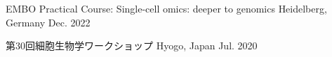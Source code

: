 

\begin{cvhonors}

  \cvworkshop
    {}
    {EMBO Practical Course: Single-cell omics: deeper to genomics} %
    {Heidelberg, Germany} %
    {Dec. 2022} %

  \cvworkshop
    {}
    {第30回細胞生物学ワークショップ} %
    {Hyogo, Japan} %
    {Jul. 2020} %

\end{cvhonors}


